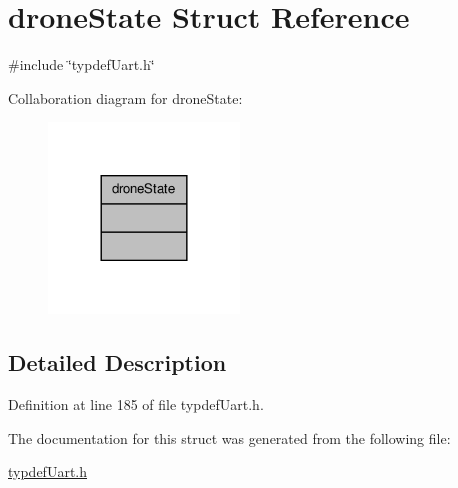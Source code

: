 \hypertarget{structdroneState}{\section{drone\-State Struct Reference}
\label{structdroneState}
}


{\ttfamily \#include \char`\"{}typdef\-Uart.\-h\char`\"{}}



Collaboration diagram for drone\-State\-:\nopagebreak
\begin{figure}[H]
\begin{center}
\leavevmode
\includegraphics[width=144pt]{structdroneState__coll__graph}
\end{center}
\end{figure}


\subsection{Detailed Description}


Definition at line 185 of file typdef\-Uart.\-h.



The documentation for this struct was generated from the following file\-:\begin{DoxyCompactItemize}
\item 
\hyperlink{typdefUart_8h}{typdef\-Uart.\-h}\end{DoxyCompactItemize}
